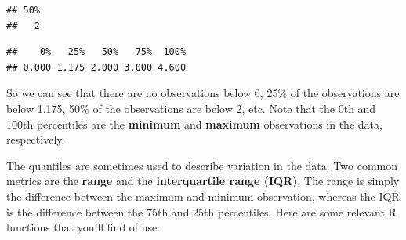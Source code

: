 \documentclass[
]{book}
\newenvironment{Shaded}{\begin{snugshade}}{\end{snugshade}}
\newcommand{\AttributeTok}[1]{\textcolor[rgb]{0.13,0.29,0.53}{#1}}
\newcommand{\DecValTok}[1]{\textcolor[rgb]{0.00,0.00,0.81}{#1}}
\newcommand{\DocumentationTok}[1]{\textcolor[rgb]{0.56,0.35,0.01}{\textbf{\textit{#1}}}}
\newcommand{\FloatTok}[1]{\textcolor[rgb]{0.00,0.00,0.81}{#1}}
\newcommand{\FunctionTok}[1]{\textcolor[rgb]{0.13,0.29,0.53}{\textbf{#1}}}
\newcommand{\NormalTok}[1]{#1}
\newcommand{\SpecialCharTok}[1]{\textcolor[rgb]{0.81,0.36,0.00}{\textbf{#1}}}
\begin{document}
\begin{Shaded}
\end{Shaded}

\begin{verbatim}
## 50% 
##   2
\end{verbatim}

\begin{Shaded}
\end{Shaded}

\begin{verbatim}
##    0%   25%   50%   75%  100% 
## 0.000 1.175 2.000 3.000 4.600
\end{verbatim}

So we can see that there are no observations below 0, 25\% of the observations are below 1.175, 50\% of the observations are below 2, etc. Note that the 0th and 100th percentiles are the \textbf{minimum} and \textbf{maximum} observations in the data, respectively.

The quantiles are sometimes used to describe variation in the data. Two common metrics are the \textbf{range} and the \textbf{interquartile range (IQR)}. The range is simply the difference between the maximum and minimum observation, whereas the IQR is the difference between the 75th and 25th percentiles. Here are some relevant R functions that you'll find of use:

\begin{Shaded}
\end{Shaded}
\end{document}

